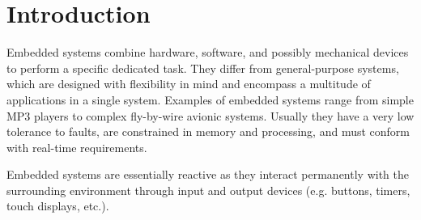 \documentclass{sigplan-proc}
\newcommand{\2}{\;\;}
\newcommand{\5}{\;\;\;\;\;}
\newcommand{\CEU}{\textsc{C\'{e}u}}
\begin{document}
\maketitle

\begin{abstract}

\CEU{} is a programming language that unifies the features found in dataflow 
and imperative synchronous reactive languages, offering a high-level and safe 
alternative to event-driven and multithreaded systems for embedded systems.

\CEU{} supports concurrent lines of execution that run in time steps and are 
allowed to share variables.
However, the synchronous and static nature of \CEU{} enables a compile time 
analysis that can enforce deterministic and memory-safe programs.

\CEU{} also introduces first-class support for ``wall-clock'' time (i.e. time 
from the real world), and offers seamless integration with $C$ and simulation 
of programs in the language itself.

The \CEU{} compiler generates single-threaded code comparable to handcrafted 
$C$ programs in terms of size and portability.
\end{abstract}




\section{Introduction}
\label{sec:intro}

Embedded systems combine hardware, software, and possibly mechanical devices to 
perform a specific dedicated task.
They differ from general-purpose systems, which are designed with flexibility 
in mind and encompass a multitude of applications in a single system.
Examples of embedded systems range from simple MP3 players to complex 
fly-by-wire avionic systems.
Usually they have a very low tolerance to faults, are constrained in memory and 
processing, and must conform with real-time requirements.

Embedded systems are essentially reactive as they interact permanently with the 
surrounding environment through input and output devices (e.g. buttons, timers, 
touch displays, etc.).
\end{document}
